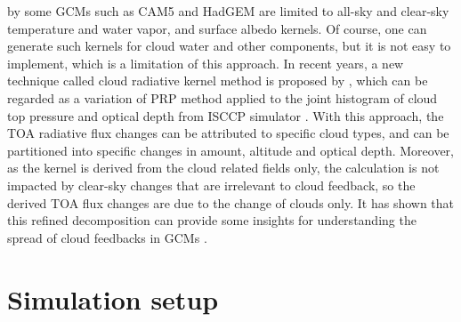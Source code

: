 by some GCMs such as CAM5 \citep{Pendergrass2018} and HadGEM \citep{Smith2020} are limited to all-sky and clear-sky temperature and water vapor, and surface albedo kernels. Of course, one can generate such kernels for cloud water and other components, but it is not easy to implement, which is a limitation of this approach. In recent years, a new technique called cloud radiative kernel method is proposed by \cite{Zelinka2012computing1,Zelinka2012computing2}, which can be regarded as a variation of PRP method applied to the joint histogram of cloud top pressure and optical depth from ISCCP simulator \citep{Klein1999validation,Webb2001combining}. With this approach, the TOA radiative flux changes can be attributed to specific cloud types, and can be partitioned into specific changes in amount, altitude and optical depth. Moreover, as the kernel is derived from the cloud related fields only, the calculation is not impacted by clear-sky changes that are irrelevant to cloud feedback, so the derived TOA flux changes are due to the change of clouds only. It has shown that this refined decomposition can provide some insights for understanding the spread of cloud feedbacks in GCMs \citep[e.g.,][]{Zelinka2016insights,Zelinka2020causes,Zelinka2021evaluating}.






\section{Simulation setup}

